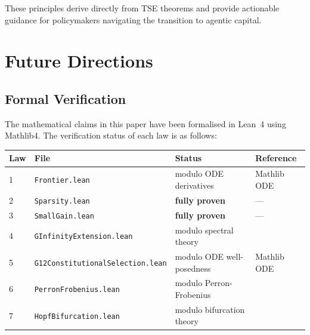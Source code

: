 \documentclass[12pt]{article}
\begin{document}
These principles derive directly from TSE theorems and provide actionable guidance for policymakers navigating the transition to agentic capital.


\section{Future Directions}
\label{sec:future}

\subsection{Formal Verification}
\label{sec:formal-verification}

The mathematical claims in this paper have been formalised in Lean~4 using Mathlib4. The verification status of each law is as follows:

\begin{center}
\begin{tabular}{llll}
\toprule
\textbf{Law} & \textbf{File} & \textbf{Status} & \textbf{Reference} \\
\midrule
1 & \texttt{Frontier.lean} & modulo ODE derivatives & Mathlib ODE \\
2 & \texttt{Sparsity.lean} & \textbf{fully proven} & --- \\
3 & \texttt{SmallGain.lean} & \textbf{fully proven} & --- \\
4 & \texttt{GInfinityExtension.lean} & modulo spectral theory & \citet{horn2012matrix} \\
5 & \texttt{G12ConstitutionalSelection.lean} & modulo ODE well-posedness & Mathlib ODE \\
6 & \texttt{PerronFrobenius.lean} & modulo Perron-Frobenius & \citet{horn2012matrix} \\
7 & \texttt{HopfBifurcation.lean} & modulo bifurcation theory & \citet{guckenheimer1983nonlinear} \\
\bottomrule
\end{tabular}
\end{center}
\end{document}
